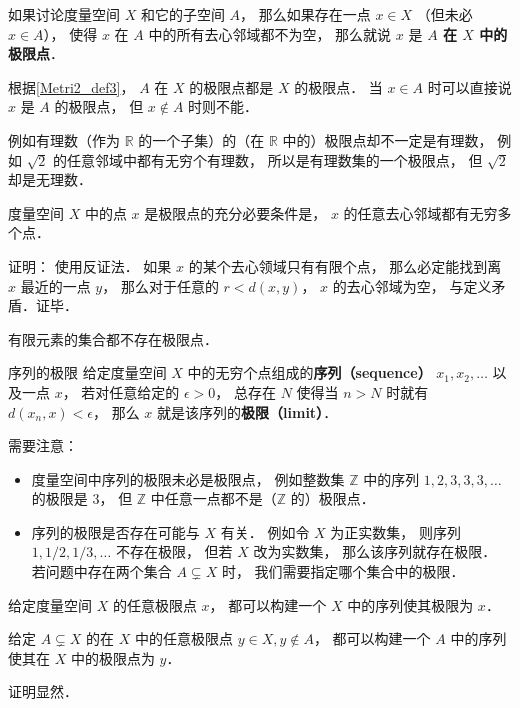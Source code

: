 \begin{definition}{}\label{Metri2_def4}
如果讨论度量空间 $X$ 和它的子空间 $A$， 那么如果存在一点 $x \in X$ （但未必 $x \in A$）， 使得 $x$ 在 $A$ 中的所有去心邻域都不为空， 那么就说 $x$ 是 \textbf{$A$ 在 $X$ 中的极限点}．

根据\autoref{Metri2_def3}， $A$ 在 $X$ 的极限点都是 $X$ 的极限点． 当 $x \in A$ 时可以直接说 $x$ 是 $A$ 的极限点， 但 $x \notin A$ 时则不能．
\end{definition}

例如有理数（作为 $\mathbb R$ 的一个子集）的（在 $\mathbb R$ 中的）极限点却不一定是有理数， 例如 $\sqrt{2}$ 的任意邻域中都有无穷个有理数， 所以是有理数集的一个极限点， 但 $\sqrt{2}$ 却是无理数．

\begin{corollary}{}
度量空间 $X$ 中的点 $x$ 是极限点的充分必要条件是， $x$ 的任意去心邻域都有无穷多个点．
\end{corollary}
证明： 使用反证法． 如果 $x$ 的某个去心领域只有有限个点， 那么必定能找到离 $x$ 最近的一点 $y$， 那么对于任意的 $r < d(x, y)$， $x$ 的去心邻域为空， 与定义矛盾．证毕．

\begin{corollary}{}
有限元素的集合都不存在极限点．
\end{corollary}

\begin{definition}{序列的极限}\label{Metri2_def1}
给定度量空间 $X$ 中的无穷个点组成的\textbf{序列（sequence）} $x_1, x_2, \dots$ 以及一点 $x$， 若对任意给定的 $\epsilon > 0$， 总存在 $N$ 使得当 $n > N$ 时就有 $d(x_n, x) < \epsilon$， 那么 $x$ 就是该序列的\textbf{极限（limit）}．
\end{definition}
需要注意：
\begin{itemize}
\item 度量空间中序列的极限未必是极限点， 例如整数集 $\mathbb Z$ 中的序列 $1, 2, 3, 3, 3, \dots$ 的极限是 $3$， 但 $\mathbb Z$ 中任意一点都不是（$\mathbb Z$ 的）极限点．
\item 序列的极限是否存在可能与 $X$ 有关． 例如令 $X$ 为正实数集， 则序列 $1, 1/2, 1/3, \dots$ 不存在极限， 但若 $X$ 改为实数集， 那么该序列就存在极限． 若问题中存在两个集合 $A \subsetneq X$ 时， 我们需要指定哪个集合中的极限．
\end{itemize}

\begin{corollary}{}
给定度量空间 $X$ 的任意极限点 $x$， 都可以构建一个 $X$ 中的序列使其极限为 $x$．

给定 $A \subsetneq X$ 的在 $X$ 中的任意极限点 $y \in X, y \notin A$， 都可以构建一个 $A$ 中的序列使其在 $X$ 中的极限点为 $y$．
\end{corollary}
证明显然．

